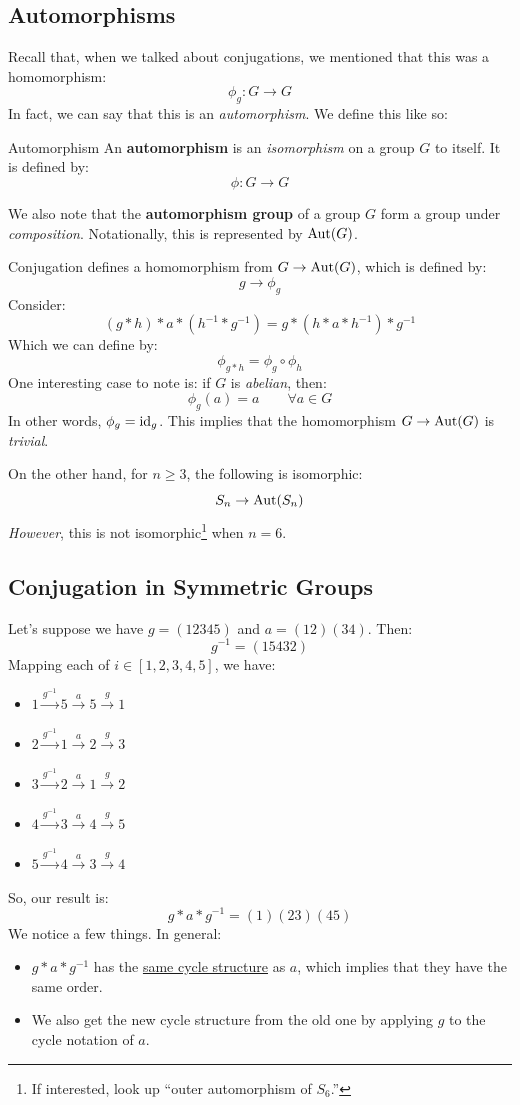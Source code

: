 \documentclass[letterpaper]{article}
\begin{document}
\subsection{Automorphisms}
Recall that, when we talked about conjugations, we mentioned that this was a homomorphism: 
\[\phi_g: G \to G\]
In fact, we can say that this is an \emph{automorphism}. We define this like so: 
\begin{definition}{Automorphism}{}
    An \textbf{automorphism} is an \emph{isomorphism} on a group $G$ to itself. It is defined by: 
    \[\phi: G \to G\]
\end{definition}
We also note that the \textbf{automorphism group} of a group $G$ form a group under \emph{composition}. Notationally, this is represented by $\operatorname{Aut}(G)$.

\bigskip 

Conjugation defines a homomorphism from $G \to \operatorname{Aut}(G)$, which is defined by: 
\[g \to \phi_g\]
Consider:
\[(g * h) * a * (h^{-1} * g^{-1}) = g * (h * a * h^{-1}) * g^{-1}\]
Which we can define by: 
\[\phi_{g * h} = \phi_g \circ \phi_h\]
One interesting case to note is: if $G$ is \emph{abelian}, then: 
\[\phi_g (a) = a \qquad \forall a \in G\]
In other words, $\phi_g = \operatorname{id}_g$. This implies that the homomorphism $G \to \operatorname{Aut}(G)$ is \emph{trivial}.

\bigskip 

On the other hand, for $n \geq 3$, the following is isomorphic:  
\[S_n \to \operatorname{Aut}(S_n)\]
\emph{However}, this is not isomorphic\footnote{If interested, look up ``outer automorphism of $S_6$.''} when $n = 6$. 

\subsection{Conjugation in Symmetric Groups}
Let's suppose we have $g = (12345)$ and $a = (12)(34)$. Then: 
\[g^{-1} = (15432)\]
Mapping each of $i \in [1, 2, 3, 4, 5]$, we have: 
\begin{itemize}
    \item $1 \xrightarrow{g^{-1}} 5 \xrightarrow{a} 5 \xrightarrow{g} 1$
    \item $2 \xrightarrow{g^{-1}} 1 \xrightarrow{a} 2 \xrightarrow{g} 3$
    \item $3 \xrightarrow{g^{-1}} 2 \xrightarrow{a} 1 \xrightarrow{g} 2$
    \item $4 \xrightarrow{g^{-1}} 3 \xrightarrow{a} 4 \xrightarrow{g} 5$
    \item $5 \xrightarrow{g^{-1}} 4 \xrightarrow{a} 3 \xrightarrow{g} 4$
\end{itemize}
So, our result is: 
\[g * a * g^{-1} = (1)(23)(45)\]
We notice a few things. In general:  
\begin{itemize}
    \item $g * a * g^{-1}$ has the \underline{same cycle structure} as $a$, which implies that they have the same order. 
    \item We also get the new cycle structure from the old one by applying $g$ to the cycle notation of $a$. 
\end{itemize}
\end{document}
